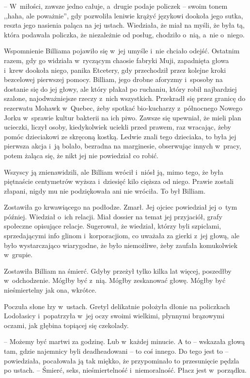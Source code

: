 \documentclass[oneside,polish,11pt,sfheadings]{mwbk}
\begin{document}
-- W~miłości, zawsze jedno całuje, a~drugie podaje policzek -- swoim tonem
,,haha, ale poważnie'', gdy pozwoliła leniwie krążyć językowi dookoła
jego sutka, reszta jego nasienia paląca na jej ustach. Wiedziała, że
miał na myśli, że była tą, która podawała policzka, że niezależnie od
posług, chodziło o~nią, a~nie o~niego.

Wspomnienie Billiama pojawiło się w~jej umyśle i~nie chciało odejść.
Ostatnim razem, gdy go widziała w~ryczącym chaosie fabryki Muji,
zapadnięta głowa i~krew dookoła niego, panika Etcetery, gdy przechodził
przez kolejne kroki bezcelowej pierwszej pomocy. Billiam, jego drobne
aforyzmy i~sposoby na dostanie się do jej głowy, ale który płakał po
ruchaniu, który robił najbardziej szalone, najodważniejsze rzeczy z~nich
wszystkich. Przekradł się przez granicę do rezerwatu Mohawk w~Quebec,
żeby spotkać bio-kucharzy z~północnego Nowego Jorku w~sprawie kultur
bakterii na ich piwo. Zawsze się upewniał, że mieli plan ucieczki,
liczył osoby, kiedykolwiek uciekli przed prawem, raz wracając, żeby
pomóc dzieciakowi ze skręconą kostką. Ledwie znali tego dzieciaka, to
była jej pierwsza akcja i~ją bolało, bezradna na marginesie, obserwując
innych w~pracy, potem żaląca się, że nikt jej nie powiedział co robić.

Wszyscy ją znienawidzili, ale Billiam wrócił i~niósł ją, mimo tego, że
była piętnaście centymetrów wyższa i~dziesięć kilo cięższa od niego.
Prawie zostali złapani, nigdy mu nie podziękowała ani nie wróciła. To
był Billiam.

Zostawiła go krwawiącego na podłodze. Zmarł. Jej ojciec powiedział jej o~tym później. Wiedział o~ich relacji. Miał dossier na temat jej
przyjaciół, grafy społeczne opisujące relacje. Sugerował, że wiedział,
którzy byli szpiclami, sprzedającymi info glinom i~korporacjiom, co
uważała za gierki z~jej głową, ale było wystarczająco wiarygodne, że
było niemożliwe, żeby zaufała komukolwiek w~grupie.

Zostawiła Billiam na śmierć. Gdyby przeżył tylko kilka lat więcej,
poszedłby w~odchodzenie. Mógłby być z~nią. Mógłby zeskanować głowę.
Mógłby być nieśmiertelny jak ona, wkrótce.

Poczuła słone łzy w~ustach. Gretyl delikatnie położyła dłonie na
policzkach Lodołasicy i~popatrzyła w~jej oczy swoimi wielkimi, płynnymi
brązowymi oczami, jak głębina topiącej się czekolady.

-- Możemy być martwi za godzinę. Lub w~każdej minucie. A to -- wskazała
głową tam, gdzie najemnicy byli deadheadowani -- to coś innego. Do tego
jest to -- powiedziała, pocałowała ją tak miękko, że przypominało to
przesunięcie pędzla po ustach. -- Śmierć, seks, nieśmiertelność i~niemoralność. Płacz jest w~porządku.
\end{document}
